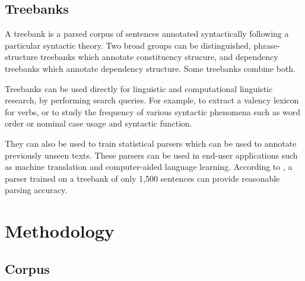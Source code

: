 \documentclass[a4paper,11pt, onecolumn,twoside]{article}
\begin{document}
\subsection{Treebanks} %

A treebank is a parsed corpus of sentences annotated syntactically following a particular
syntactic theory. Two broad groups can be distinguished, phrase-structure treebanks
which annotate constituency strucure, and dependency treebanks which annotate dependency
structure. Some treebanks combine both.

Treebanks can be used directly for linguistic and computational linguistic research, by
performing search queries. For example, to extract a valency lexicon for verbs, or to
study the frequency of various syntactic phenomena such as word order or nominal case usage
and syntactic function.

They can also be used to train statistical parsers which can
be used to annotate previously unseen texts. These parsers can be used in end-user applications
such as machine translation and computer-aided language learning.
According to \textcite{nivre08}, a parser trained on a treebank of only 1,500 sentences 
can provide reasonable parsing accuracy.


\section{Methodology}\label{sec:method}

\subsection{Corpus}
\end{document}
